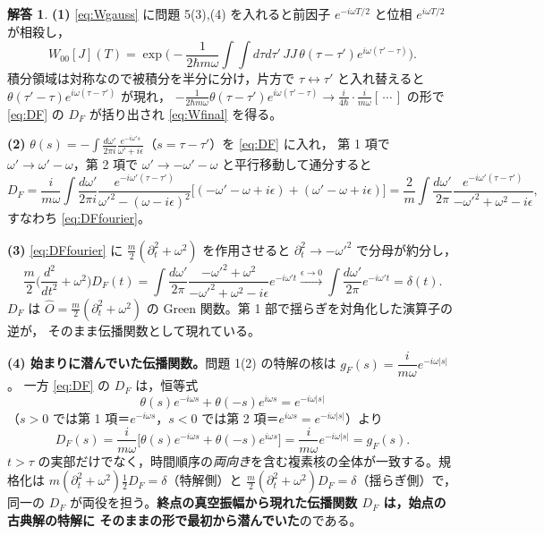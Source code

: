 \documentclass[dvipdfmx, uplatex]{jsarticle}
\theoremstyle{definition}
\newtheorem*{sol}{解答}
\begin{document}
\begin{sol}
\textbf{(1)} \eqref{eq:Wgauss} に問題 5(3),(4) を入れると前因子 $e^{-i\omega T/2}$ と位相 $e^{i\omega T/2}$ が相殺し，
\[
    W_{00}[J](T)=\exp\!\Big(-\frac{1}{2\hbar m\omega}\!\int\!\!\int d\tau d\tau'\,JJ\,\theta(\tau-\tau')e^{i\omega(\tau'-\tau)}\Big).
\]
積分領域は対称なので被積分を半分に分け，片方で $\tau\leftrightarrow\tau'$ と入れ替えると
$\theta(\tau'-\tau)e^{i\omega(\tau-\tau')}$ が現れ，
$-\frac{1}{2\hbar m\omega}\theta(\tau-\tau')e^{i\omega(\tau'-\tau)}\to\frac{i}{4\hbar}\cdot\frac{i}{m\omega}[\,\cdots\,]$ の形で
\eqref{eq:DF} の $D_F$ が括り出され \eqref{eq:Wfinal} を得る。

\par\smallskip
\textbf{(2)} $\theta(s)=-\int\frac{d\omega'}{2\pi i}\frac{e^{-i\omega's}}{\omega'+i\epsilon}$（$s=\tau-\tau'$）を \eqref{eq:DF} に入れ，
第 1 項で $\omega'\to\omega'-\omega$，第 2 項で $\omega'\to-\omega'-\omega$ と平行移動して通分すると
\[
    D_F=\frac{i}{m\omega}\int\frac{d\omega'}{2\pi i}
    \frac{e^{-i\omega'(\tau-\tau')}}{\omega'^2-(\omega-i\epsilon)^2}
    \big[(-\omega'-\omega+i\epsilon)+(\omega'-\omega+i\epsilon)\big]
    =\frac{2}{m}\int\frac{d\omega'}{2\pi}\frac{e^{-i\omega'(\tau-\tau')}}{-\omega'^2+\omega^2-i\epsilon},
\]
すなわち \eqref{eq:DFfourier}。

\par\smallskip
\textbf{(3)} \eqref{eq:DFfourier} に $\frac{m}{2}(\partial_t^2+\omega^2)$ を作用させると $\partial_t^2\to-\omega'^2$ で分母が約分し，
\[
    \frac{m}{2}\Big(\frac{d^2}{dt^2}+\omega^2\Big)D_F(t)
    =\int\frac{d\omega'}{2\pi}\frac{-\omega'^2+\omega^2}{-\omega'^2+\omega^2-i\epsilon}e^{-i\omega't}
    \xrightarrow{\epsilon\to0}\int\frac{d\omega'}{2\pi}e^{-i\omega't}=\delta(t).
\]
$D_F$ は $\hat O=\frac{m}{2}(\partial_t^2+\omega^2)$ の Green 関数。第 1 部で揺らぎを対角化した演算子の逆が，
そのまま伝播関数として現れている。

\par\smallskip
\textbf{(4) 始まりに潜んでいた伝播関数。}問題 1(2) の特解の核は $g_F(s)=\dfrac{i}{m\omega}e^{-i\omega|s|}$。
一方 \eqref{eq:DF} の $D_F$ は，恒等式
\[
    \theta(s)e^{-i\omega s}+\theta(-s)e^{i\omega s}=e^{-i\omega|s|}
\]
（$s>0$ では第 1 項＝$e^{-i\omega s}$，$s<0$ では第 2 項＝$e^{i\omega s}=e^{-i\omega|s|}$）より
\[
    D_F(s)=\frac{i}{m\omega}\bigl[\theta(s)e^{-i\omega s}+\theta(-s)e^{i\omega s}\bigr]
    =\frac{i}{m\omega}e^{-i\omega|s|}=\boxed{g_F(s)}.
\]
$t>\tau$ の実部だけでなく，時間順序の\emph{両向き}を含む複素核の全体が一致する。規格化は
$m(\partial_t^2+\omega^2)\tfrac12 D_F=\delta$（特解側）と $\frac m2(\partial_t^2+\omega^2)D_F=\delta$（揺らぎ側）で，
同一の $D_F$ が両役を担う。\textbf{終点の真空振幅から現れた伝播関数 $D_F$ は，始点の古典解の特解に
そのままの形で最初から潜んでいた}のである。
\end{sol}
\end{document}
